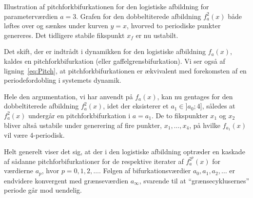 {
\vspace{0.15cm}
 \hspace*{-1.4cm}
 \begin{minipage}{4cm}
  
 \end{minipage}
 \begin{minipage}{4cm}
  
 \end{minipage}
 \begin{minipage}{4cm}
  
 \end{minipage}
 \vspace{-0.8cm}
}
{
\caption{\protect\capsize
Illustration af pitchforkbifurkationen for den logistiske
afbildning for parameterv{\ae}rdien $a=3$. Grafen for den
dobbeltiterede afbildning $f^2_a(x)$ b{\aa}de l{\o}ftes
over og s{\ae}nkes under kurven $y=x$, hvorved to
periodiske punkter genereres. Det tidligere stabile
fikspunkt $x_f$ er nu ustabilt.}
\label{fig:LogGraf}
}

Det skift, der er indtr{\aa}dt i dynamikken for den
logistiske afbildning $f_a(x)$, kaldes en
pitchforkbifurkation (eller gaffelgrensbifurkation). Vi ser
ogs{\aa} af lig\-ning~\ref{eq:Pitch}, at
pitchforkbifurkationen er {\ae}kvivalent med forekomsten af
en periodefordobling i sy\-stemets dynamik.

\vspace{4.0mm}
Hele den argumentation, vi har anvendt p{\aa} $f_a(x)$, kan
nu gentages for den dobbeltiterede afbildning $f_a^2(x)$,
idet der eksisterer et $a_1 \in ]a_0;4]$, s{\aa}ledes at
$f_a^2(x)$ underg{\aa}r en pitchforkbifurkation i $a=a_1$.
De to fikspunkter $x_1$ og $x_2$ bliver alts{\aa} ustabile
under generering af fire punkter, $x_1,\ldots,x_4$, p{\aa}
hvilke $f_{a_1}(x)$ vil v{\ae}re 4-periodisk.


\vspace{4.0mm}
Helt generelt viser det sig, at der i den logistiske
afbildning optr{\ae}der en kaskade af s{\aa}danne
pitchforbifurkationer for de respektive iterater af
$f_a^{2^p}(x)$ for v{\ae}rdierne $a_p$, hvor $p =
0,1,2,\ldots$. F{\o}lgen af bifurkationsv{\ae}rdier
$a_0,a_1,a_2,\ldots$ er endvidere konvergent med
gr{\ae}nsev{\ae}rdien $a_\infty$, svarende til at
``gr{\ae}nse\-cyklu\-ser\-nes'' periode g{\aa}r mod uendelig.

